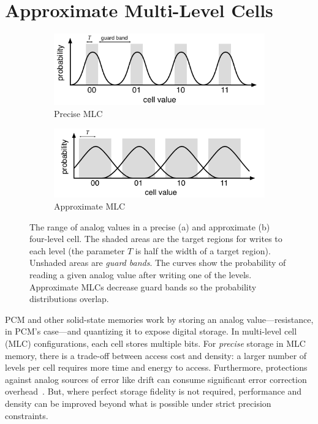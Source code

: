 \documentclass[prodmode,acmtocs]{acmsmall}
\begin{document}
\section{Approximate Multi-Level Cells}
\label{sec:amlc}

\begin{figure}
    \begin{subfigure}{0.5\columnwidth}
        \centering
        \includegraphics[scale=0.8]{figs/mlc-precise.pdf}
        \caption{Precise MLC}
        \label{fig:mlc-precise}
    \end{subfigure}
    \begin{subfigure}{0.5\columnwidth}
        \centering
        \includegraphics[scale=0.8]{figs/mlc-approx.pdf}
        \caption{Approximate MLC}
        \label{fig:mlc-approx}
    \end{subfigure}
    \caption{
        The range of analog values in a precise (a) and approximate (b) four-level cell. The shaded areas are
        the target regions for writes to each level (the parameter $T$ is half
        the width of a target region). Unshaded areas are
        \emph{guard bands}. The curves show the probability of reading a given
        analog value after writing one of the levels. Approximate  MLCs
        decrease guard bands so the probability distributions overlap.
    }
    \label{fig:mlc}
\end{figure}

PCM and other solid-state memories
work by storing an analog value---resistance, in PCM's case---and quantizing it to expose digital
storage. In multi-level cell (MLC) configurations, each cell stores
multiple bits. For \emph{precise} storage in MLC memory,
there is a trade-off between access cost and density: a larger number
of levels per cell requires more time and energy to access.
Furthermore, protections against analog sources of error like drift can consume
significant error correction overhead~\cite{drifttolerant}.
But, where perfect storage fidelity is not required,
performance and density can be improved beyond what is possible under
strict precision constraints.
\end{document}
